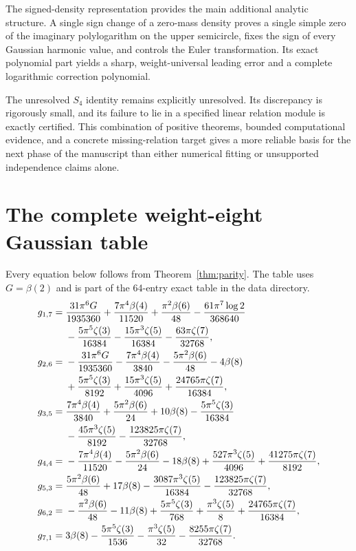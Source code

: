 \documentclass[11pt,a4paper]{article}
\numberwithin{equation}{section}
\theoremstyle{definition}
\theoremstyle{remark}
\begin{document}
The signed-density representation provides the main additional analytic structure. A single sign change of a zero-mass density proves a single simple zero of the imaginary polylogarithm on the upper semicircle, fixes the sign of every Gaussian harmonic value, and controls the Euler transformation. Its exact polynomial part yields a sharp, weight-universal leading error and a complete logarithmic correction polynomial.

The unresolved $S_4$ identity remains explicitly unresolved. Its discrepancy is rigorously small, and its failure to lie in a specified linear relation module is exactly certified. This combination of positive theorems, bounded computational evidence, and a concrete missing-relation target gives a more reliable basis for the next phase of the manuscript than either numerical fitting or unsupported independence claims alone.

\clearpage
\appendix
\section{The complete weight-eight Gaussian table}
\label{app:weight8}
Every equation below follows from Theorem~\ref{thm:parity}. The table uses $G=\beta(2)$ and is part of the 64-entry exact table in the data directory.
\begin{align}
 g_{1,7}={}&\frac{31\pi^6G}{1935360}+\frac{7\pi^4\beta(4)}{11520}
 +\frac{\pi^2\beta(6)}{48}-\frac{61\pi^7\log2}{368640}\notag\\
 &-\frac{5\pi^5\zeta(3)}{16384}-\frac{15\pi^3\zeta(5)}{16384}
 -\frac{63\pi\zeta(7)}{32768},\\
 g_{2,6}={}&-\frac{31\pi^6G}{1935360}-\frac{7\pi^4\beta(4)}{3840}
 -\frac{5\pi^2\beta(6)}{48}-4\beta(8)\notag\\
 &+\frac{5\pi^5\zeta(3)}{8192}+\frac{15\pi^3\zeta(5)}{4096}
 +\frac{24765\pi\zeta(7)}{16384},\\
 g_{3,5}={}&\frac{7\pi^4\beta(4)}{3840}+\frac{5\pi^2\beta(6)}{24}
 +10\beta(8)-\frac{5\pi^5\zeta(3)}{16384}\notag\\
 &-\frac{45\pi^3\zeta(5)}{8192}-\frac{123825\pi\zeta(7)}{32768},\\
 g_{4,4}={}&-\frac{7\pi^4\beta(4)}{11520}-\frac{5\pi^2\beta(6)}{24}
 -18\beta(8)+\frac{527\pi^3\zeta(5)}{4096}
 +\frac{41275\pi\zeta(7)}{8192},\\
 g_{5,3}={}&\frac{5\pi^2\beta(6)}{48}+17\beta(8)
 -\frac{3087\pi^3\zeta(5)}{16384}-\frac{123825\pi\zeta(7)}{32768},\\
 g_{6,2}={}&-\frac{\pi^2\beta(6)}{48}-11\beta(8)
 +\frac{5\pi^5\zeta(3)}{768}+\frac{\pi^3\zeta(5)}8
 +\frac{24765\pi\zeta(7)}{16384},\\
 g_{7,1}={}&3\beta(8)-\frac{5\pi^5\zeta(3)}{1536}
 -\frac{\pi^3\zeta(5)}{32}-\frac{8255\pi\zeta(7)}{32768}.
\end{align}
\end{document}
